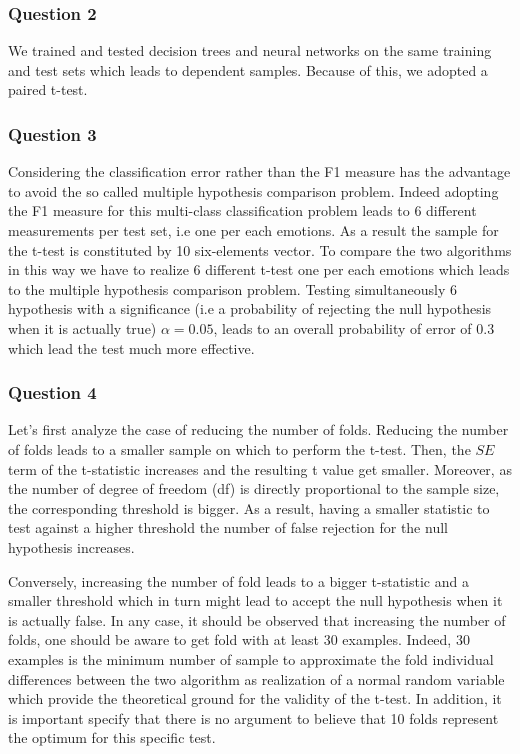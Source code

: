 \documentclass{article}
\begin{document}
\subsubsection*{Question 2}
We trained and tested decision trees and neural networks on the same training and test sets which leads to dependent samples. Because of this, we adopted a paired t-test.

\subsubsection*{Question 3}
Considering the classification error rather than the F1 measure has the advantage to avoid the so called multiple hypothesis comparison problem. Indeed adopting the F1 measure for this multi-class classification problem leads to 6 different measurements per test set, i.e one per each emotions. As a result the sample for the t-test is constituted by 10 six-elements vector. To compare the two algorithms in this way we have to realize 6 different t-test one per each emotions which leads to the multiple hypothesis comparison problem. Testing simultaneously 6 hypothesis with a significance (i.e a probability of rejecting the null hypothesis when it is actually true) $\alpha=0.05$, leads to an overall probability of error of $0.3$ which lead the test much more effective.

\subsubsection*{Question 4}
Let's first analyze the case of reducing the number of folds. Reducing the number of folds leads to a smaller sample on which to perform the t-test. Then, the $SE$ term of the t-statistic increases and the resulting t value get smaller. Moreover, as the number of degree of freedom (df) is directly proportional to the sample size, the corresponding threshold is bigger. As a result, having a smaller statistic to test against a higher threshold the number of false rejection for the null hypothesis increases. 

Conversely, increasing the number of fold leads to a bigger t-statistic and a smaller threshold which in turn might lead to accept the null hypothesis when it is actually false. In any case, it should be observed that increasing the number of folds, one should be aware to get fold with at least 30 examples. Indeed, 30 examples is the minimum number of sample to approximate the fold individual differences between the two algorithm as realization of a normal random variable which provide the theoretical ground for the validity of the t-test. In addition, it is important specify that there is no argument to believe that 10 folds represent the optimum for this specific test.
\end{document}
